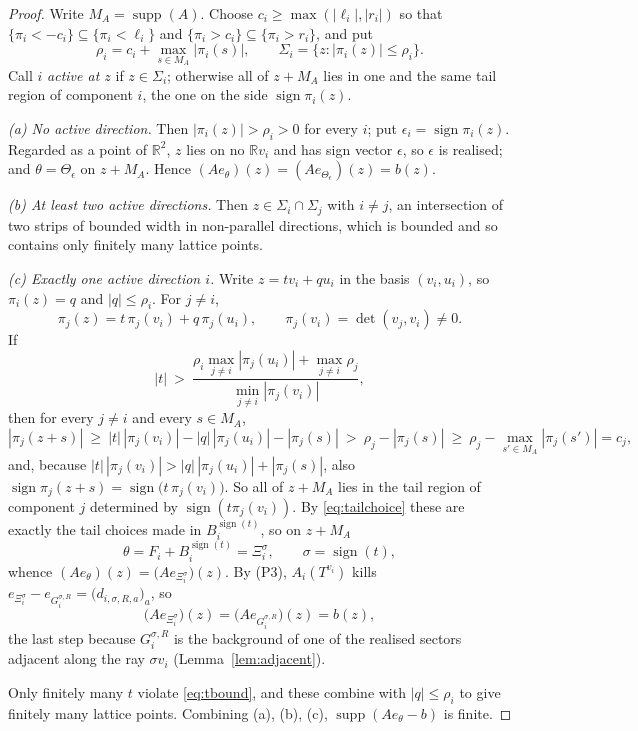 \documentclass[11pt,reqno]{amsart}
\theoremstyle{plain}
\theoremstyle{definition}
\theoremstyle{remark}
\theoremstyle{plain}
\theoremstyle{remark}
\theoremstyle{definition}
\numberwithin{equation}{section}
\DeclareMathOperator{\supp}{supp}
\DeclareMathOperator{\sgn}{sign}
\newcommand{\R}{\mathbb{R}}
\begin{document}
\begin{proof}
Write $M_A=\supp(A)$.  Choose $c_i\ge\max(|\ell_i|,|r_i|)$ so that
$\{\pi_i<-c_i\}\subseteq\{\pi_i<\ell_i\}$ and
$\{\pi_i>c_i\}\subseteq\{\pi_i>r_i\}$, and put
\[\rho_i=c_i+\max_{s\in M_A}|\pi_i(s)|,\qquad \Sigma_i=\{z:|\pi_i(z)|\le\rho_i\}.\]
Call $i$ \emph{active at $z$} if $z\in\Sigma_i$; otherwise all of $z+M_A$ lies
in one and the same tail region of component $i$, the one on the side
$\sgn\pi_i(z)$.

\emph{(a) No active direction.}  Then $|\pi_i(z)|>\rho_i>0$ for every $i$; put
$\epsilon_i=\sgn\pi_i(z)$.  Regarded as a point of $\R^2$, $z$ lies on no
$\R v_i$ and has sign vector $\epsilon$, so $\epsilon$ is realised; and
$\theta=\Theta_\epsilon$ on $z+M_A$.  Hence
$(Ae_\theta)(z)=(Ae_{\Theta_\epsilon})(z)=b(z)$.

\emph{(b) At least two active directions.}  Then $z\in\Sigma_i\cap\Sigma_j$ with
$i\ne j$, an intersection of two strips of bounded width in non-parallel
directions, which is bounded and so contains only finitely many lattice points.

\emph{(c) Exactly one active direction $i$.}  Write $z=tv_i+qu_i$ in the basis
$(v_i,u_i)$, so $\pi_i(z)=q$ and $|q|\le\rho_i$.  For $j\ne i$,
\[\pi_j(z)=t\,\pi_j(v_i)+q\,\pi_j(u_i),\qquad \pi_j(v_i)=\det(v_j,v_i)\ne0 .\]
If
\begin{equation}
|t|\ >\ \frac{\rho_i\max_{j\ne i}|\pi_j(u_i)|+\max_{j\ne i}\rho_j}
             {\min_{j\ne i}|\pi_j(v_i)|}, \label{eq:tbound}
\end{equation}
then for every $j\ne i$ and every $s\in M_A$,
\[|\pi_j(z+s)|\ \ge\ |t|\,|\pi_j(v_i)|-|q|\,|\pi_j(u_i)|-|\pi_j(s)|
  \ >\ \rho_j-|\pi_j(s)|\ \ge\ \rho_j-\max_{s'\in M_A}|\pi_j(s')|=c_j,\]
and, because $|t|\,|\pi_j(v_i)|>|q|\,|\pi_j(u_i)|+|\pi_j(s)|$, also
$\sgn\pi_j(z+s)=\sgn\bigl(t\,\pi_j(v_i)\bigr)$.  So all of $z+M_A$ lies in the
tail region of component $j$ determined by $\sgn(t\pi_j(v_i))$.  By
\eqref{eq:tailchoice} these are exactly the tail choices made in
$B_i^{\sgn(t)}$, so on $z+M_A$
\[\theta=F_i+B_i^{\sgn(t)}=\Xi_i^{\sigma},\qquad\sigma=\sgn(t),\]
whence $(Ae_\theta)(z)=\bigl(Ae_{\Xi_i^{\sigma}}\bigr)(z)$.  By \textup{(P3)},
$A_i(T^{v_i})$ kills
$e_{\Xi_i^\sigma}-e_{G_i^{\sigma,R}}=\bigl(d_{i,\sigma,R,a}\bigr)_a$, so
\[\bigl(Ae_{\Xi_i^\sigma}\bigr)(z)=\bigl(Ae_{G_i^{\sigma,R}}\bigr)(z)=b(z),\]
the last step because $G_i^{\sigma,R}$ is the background of one of the realised
sectors adjacent along the ray $\sigma v_i$ (Lemma~\ref{lem:adjacent}).

Only finitely many $t$ violate \eqref{eq:tbound}, and these combine with
$|q|\le\rho_i$ to give finitely many lattice points.  Combining (a), (b), (c),
$\supp(Ae_\theta-b)$ is finite.
\end{proof}
\end{document}
